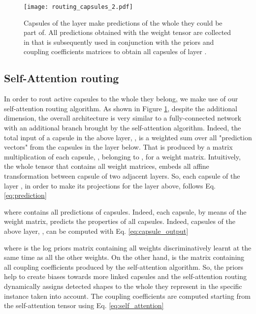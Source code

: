 \documentclass{article}
\begin{document}
\begin{figure}[t]
    \centering
    \texttt{[image: routing\_capsules\_2.pdf]}
    \caption{Capsules of the layer  make predictions of the whole they could be part of. All predictions obtained with the weight tensor  are collected in  that is subsequently used in conjunction with the priors  and coupling coefficients  matrices to obtain all capsules  of layer .}
    \label{fig:routing_capsules}
\end{figure}
\subsection*{Self-Attention routing}
In order to rout active capsules to the whole they belong, we make use of our self-attention routing algorithm. As shown in Figure \ref{fig:routing_capsules}, despite the additional dimension, the overall architecture is very similar to a fully-connected network with an additional branch brought by the self-attention algorithm. Indeed, the total input of a capsule  in the above layer, , is a weighted sum over all "prediction vectors" from the capsules  in the layer below. That is produced by a matrix multiplication of each capsule, , belonging to , for a weight matrix. Intuitively, the whole tensor  that contains all weight matrices, embeds all affine transformation between capsule of two adjacent layers. So, each capsule of the layer , in order to make its projections for the layer above, follows Eq. \ref{eq:prediction}
\begin{ceqn}

\end{ceqn}
 where  contains all predictions of  capsules. Indeed, each  capsule, by means of the weight matrix, predicts the properties of all  capsules. Indeed, capsules of the above layer, , can be computed with Eq. \ref{eq:capsule_output}
\begin{ceqn}

\end{ceqn}
where  is the log priors matrix containing all weights discriminatively learnt at the same time as all the other weights. On the other hand,  is the matrix containing all coupling coefficients produced by the self-attention algorithm. So, the priors help to create biases towards more linked capsules and the self-attention routing dynamically assigns detected shapes to the whole they represent in the specific  instance taken into account. The coupling coefficients are computed starting from the self-attention tensor  using Eq. \ref{eq:self_attention}
\end{document}
